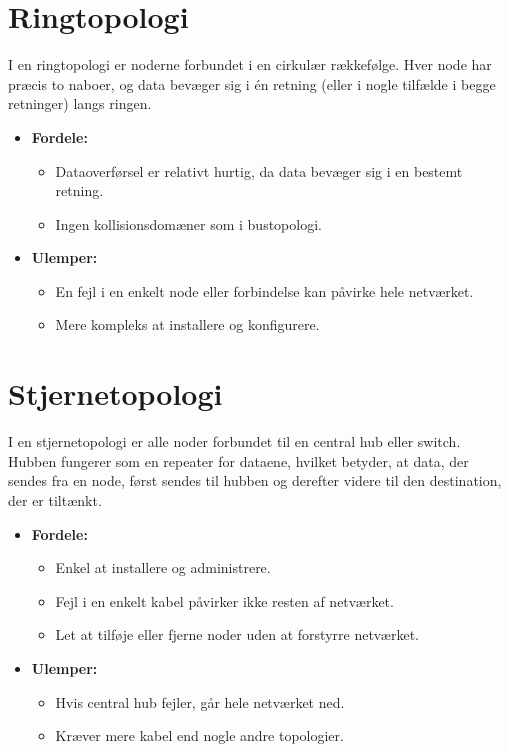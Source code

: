\section{Ringtopologi}
I en ringtopologi er noderne forbundet i en cirkulær rækkefølge. Hver node har præcis to naboer, og data bevæger sig i én retning (eller i nogle tilfælde i begge retninger) langs ringen.
\begin{itemize}
	\item \textbf{Fordele:}
	\begin{itemize}
		\item Dataoverførsel er relativt hurtig, da data bevæger sig i en bestemt retning.
		\item Ingen kollisionsdomæner som i bustopologi.
	\end{itemize}
	\item \textbf{Ulemper:}
	\begin{itemize}
		\item En fejl i en enkelt node eller forbindelse kan påvirke hele netværket.
		\item Mere kompleks at installere og konfigurere.
	\end{itemize}
\end{itemize}

\section{Stjernetopologi}
I en stjernetopologi er alle noder forbundet til en central hub eller switch. Hubben fungerer som en repeater for dataene, hvilket betyder, at data, der sendes fra en node, først sendes til hubben og derefter videre til den destination, der er tiltænkt.
\begin{itemize}
	\item \textbf{Fordele:}
	\begin{itemize}
		\item Enkel at installere og administrere.
		\item Fejl i en enkelt kabel påvirker ikke resten af netværket.
		\item Let at tilføje eller fjerne noder uden at forstyrre netværket.
	\end{itemize}
	\item \textbf{Ulemper:}
	\begin{itemize}
		\item Hvis central hub fejler, går hele netværket ned.
		\item Kræver mere kabel end nogle andre topologier.
	\end{itemize}
\end{itemize}

